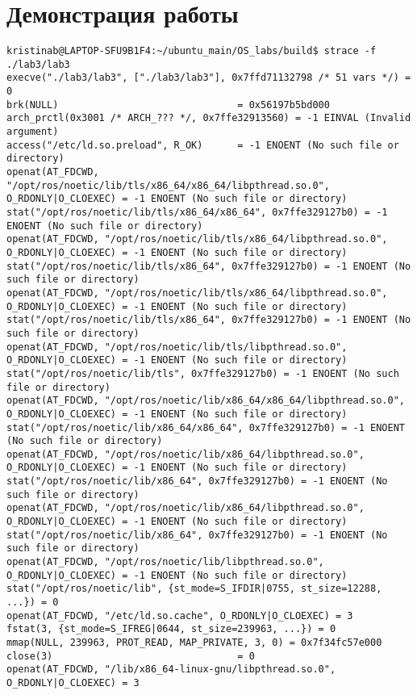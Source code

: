 \documentclass[a4paper, 12pt]{article}
\begin{document}
\section{Демонстрация работы}
\begin{lstlisting}
kristinab@LAPTOP-SFU9B1F4:~/ubuntu_main/OS_labs/build$ strace -f ./lab3/lab3
execve("./lab3/lab3", ["./lab3/lab3"], 0x7ffd71132798 /* 51 vars */) = 0
brk(NULL)                               = 0x56197b5bd000
arch_prctl(0x3001 /* ARCH_??? */, 0x7ffe32913560) = -1 EINVAL (Invalid argument)
access("/etc/ld.so.preload", R_OK)      = -1 ENOENT (No such file or directory)
openat(AT_FDCWD, "/opt/ros/noetic/lib/tls/x86_64/x86_64/libpthread.so.0", O_RDONLY|O_CLOEXEC) = -1 ENOENT (No such file or directory)
stat("/opt/ros/noetic/lib/tls/x86_64/x86_64", 0x7ffe329127b0) = -1 ENOENT (No such file or directory)
openat(AT_FDCWD, "/opt/ros/noetic/lib/tls/x86_64/libpthread.so.0", O_RDONLY|O_CLOEXEC) = -1 ENOENT (No such file or directory)
stat("/opt/ros/noetic/lib/tls/x86_64", 0x7ffe329127b0) = -1 ENOENT (No such file or directory)
openat(AT_FDCWD, "/opt/ros/noetic/lib/tls/x86_64/libpthread.so.0", O_RDONLY|O_CLOEXEC) = -1 ENOENT (No such file or directory)
stat("/opt/ros/noetic/lib/tls/x86_64", 0x7ffe329127b0) = -1 ENOENT (No such file or directory)
openat(AT_FDCWD, "/opt/ros/noetic/lib/tls/libpthread.so.0", O_RDONLY|O_CLOEXEC) = -1 ENOENT (No such file or directory)
stat("/opt/ros/noetic/lib/tls", 0x7ffe329127b0) = -1 ENOENT (No such file or directory)
openat(AT_FDCWD, "/opt/ros/noetic/lib/x86_64/x86_64/libpthread.so.0", O_RDONLY|O_CLOEXEC) = -1 ENOENT (No such file or directory)
stat("/opt/ros/noetic/lib/x86_64/x86_64", 0x7ffe329127b0) = -1 ENOENT (No such file or directory)
openat(AT_FDCWD, "/opt/ros/noetic/lib/x86_64/libpthread.so.0", O_RDONLY|O_CLOEXEC) = -1 ENOENT (No such file or directory)
stat("/opt/ros/noetic/lib/x86_64", 0x7ffe329127b0) = -1 ENOENT (No such file or directory)
openat(AT_FDCWD, "/opt/ros/noetic/lib/x86_64/libpthread.so.0", O_RDONLY|O_CLOEXEC) = -1 ENOENT (No such file or directory)
stat("/opt/ros/noetic/lib/x86_64", 0x7ffe329127b0) = -1 ENOENT (No such file or directory)
openat(AT_FDCWD, "/opt/ros/noetic/lib/libpthread.so.0", O_RDONLY|O_CLOEXEC) = -1 ENOENT (No such file or directory)
stat("/opt/ros/noetic/lib", {st_mode=S_IFDIR|0755, st_size=12288, ...}) = 0
openat(AT_FDCWD, "/etc/ld.so.cache", O_RDONLY|O_CLOEXEC) = 3
fstat(3, {st_mode=S_IFREG|0644, st_size=239963, ...}) = 0
mmap(NULL, 239963, PROT_READ, MAP_PRIVATE, 3, 0) = 0x7f34fc57e000
close(3)                                = 0
openat(AT_FDCWD, "/lib/x86_64-linux-gnu/libpthread.so.0", O_RDONLY|O_CLOEXEC) = 3

\end{lstlisting}
\end{document}
